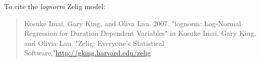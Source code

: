 To cite the \emph{ lognorm } Zelig model:
 \begin{verse}
 Kosuke Imai, Gary King, and Oliva Lau. 2007. "lognorm: Log-Normal Regression for Duration Dependent Variables" in Kosuke Imai, Gary King, and Olivia Lau, "Zelig: Everyone's Statistical Software,"\url{http://gking.harvard.edu/zelig} 
\end{verse}